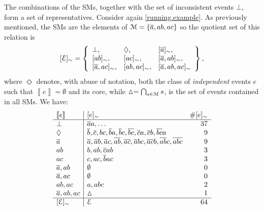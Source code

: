 \documentclass{article}
\newcommand{\co}[1]{\ensuremath{\overline{#1}}}
\newcommand{\cla}[1]{\ensuremath{{\cal #1}}}
\newcommand{\stablecore}[1]{\ensuremath{\left\llbracket #1 \right\rrbracket}}
\newcommand{\class}[1]{\ensuremath{[{#1}]_{\sim}}}
\newcommand{\inconsistent}{\bot}
\newcommand{\emptyevent}{\ensuremath{\vartriangle}}
\newcommand{\indepclass}{\ensuremath{\Diamond}}
\newcommand{\MODELset}{\ensuremath{\cla{M}}}
\newcommand{\EVENTSset}{\ensuremath{\cla{E}}}
\newcounter{remark}
\newcommand{\note}[1]{
	\stepcounter{remark}%
	{\!\!\color{red}/}\footnotemark[\arabic{remark}]\!\!%
	\footnotetext[\arabic{remark}]{{\color{red}/}#1}
}
\begin{document}
The combinations of the \aclp{SM}, together with the set of
inconsistent events $\inconsistent$, form a set of representatives.
Consider again \cref{running.example}.  As previously mentioned, the
\aclp{SM} are the elements of $\MODELset = \set{\co{a}, ab, ac}$ so
the quotient set of this relation is
\begin{equation}
	\class{\EVENTSset} = \set{
		\begin{array}{lll}
			\inconsistent,      &
			\indepclass,        &
			\class{\co{a}},       \\
			\class{ab},         &
			\class{ac},         &
			\class{\co{a}, ab},   \\
			\class{\co{a}, ac}, &
			\class{ab, ac},     &
			\class{\co{a}, ab, ac}
		\end{array}
	},
\end{equation}
where $\indepclass$ denotes, with abuse of notation, both the class of
\emph{independent} events $e$ such that $\stablecore{e} = \emptyset$
and its core, while $\emptyevent = \bigcap_{s\in \MODELset} s$, is the
set of events contained in all \acp{SM}.  We have:
%
\begin{equation*}
	\begin{array}{l|lr}
		\stablecore{e}
		 & \class{e}
		 & \# \class{e}                                                                       \\
		\hline
		\inconsistent
		 & \co{a}a, \ldots
		 & 37
		\\
		\indepclass
		 & \co{b}, \co{c}, bc, \co{b}a, \co{b}c, \co{bc}, \co{c}a, \co{c}b, \co{bc}a
		 & 9
		\\
		\co{a}
		 & \co{a}, \co{a}b, \co{a}c, \co{ab}, \co{ac}, \co{a}bc, \co{ac}b, \co{ab}c, \co{abc}
		 & 9
		\\
		ab
		 & b, ab, \co{c}ab
		 & 3
		\\
		ac
		 & c, ac, \co{b}ac
		 & 3
		\\
		\co{a}, ab
		 & \emptyset
		 & 0
		\\
		\co{a}, ac
		 & \emptyset
		 & 0
		\\
		ab, ac
		 & a, abc
		 & 2
		\\
		\co{a}, ab, ac
		 & \emptyevent
		 & 1
		\\
		\hline
		\class{\EVENTSset}
		 & \EVENTSset
		 & 64
	\end{array}
\end{equation*}
\end{document}
